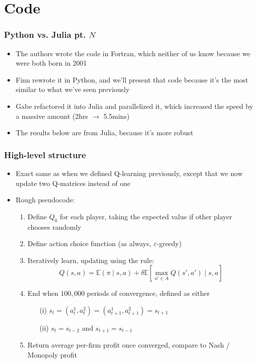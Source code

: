\documentclass{beamer}
\begin{document}
\section{Code}

\begin{frame}\frametitle{Python vs. Julia pt. $N$}
	\begin{itemize}
		\item The authors wrote the code in Fortran, which neither of us know because we were both born in 2001 
		\item Finn rewrote it in Python, and we'll present that code because it's the most similar to what we've seen previously
		\item Gabe refactored it into Julia and parallelized it, which increased the speed by a massive amount (2hrs $\to$ 5.5mins)
		\item The results below are from Julia, because it's more robust
	\end{itemize}
\end{frame}

\begin{frame}\frametitle{High-level structure}
	\begin{itemize}
		\item Exact same as when we defined Q-learning previously, except that we now update two Q-matrices instead of one
		\item Rough pseudocode: 
		\begin{enumerate}
			\item Define $Q_0$ for each player, taking the expected value if other player chooses randomly
			\item Define action choice function (as always, $\varepsilon$-greedy)
			\item Iteratively learn, updating using the rule:\[Q(s,a) = \mathbb{E}(\pi \mid s,a) + \delta \mathbb{E}\left[ \max_{a'\in A} Q(s',a') \mid s,a\right]\]
			\item End when $100,000$ periods of convergence, defined as either \begin{itemize} \item[(i)] $s_t = (a^1_t,a^2_t) = (a^1_{t+1},a^2_{t+1}) = s_{t+1}$ \item[(ii)] $s_t = s_{t-2}$ \alert{and} $s_{t+1} = s_{t-1}$ \end{itemize}
			\item Return average per-firm profit once converged, compare to Nash / Monopoly profit
		\end{enumerate}
	\end{itemize}
	
\end{frame}
\end{document}
